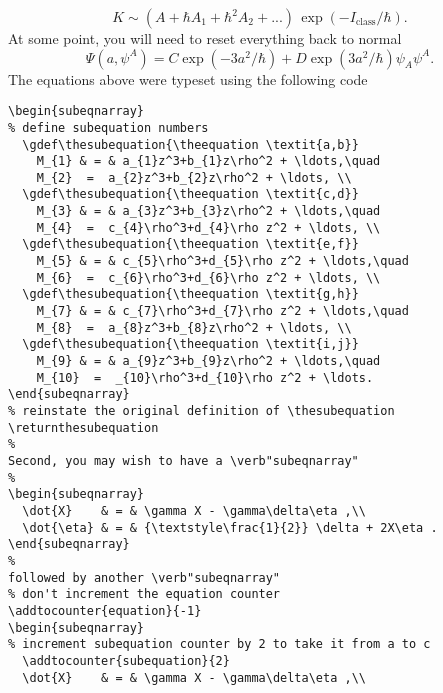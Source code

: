 \documentclass{jfm}
\begin{document}
\let\oldequation=\theequation
\renewcommand\theequation{4.4\textit{e}}
\begin{equation}
  K\sim(A + {\hbar} {A_1} +{{\hbar}^2} {A_2} +...)\,
    \exp(-I_{\mathrm{class}}/{\hbar}).
\end{equation}
%
At some point, you will need to reset everything back to normal
\let\theequation=\oldequation
\setcounter{equation}{4}
\begin{equation}
  \Psi(a, \psi^A) = C \exp(-3a^2/\hbar) + D \exp(3a^2/\hbar)
    {\psi_A}{\psi^A}.
\end{equation}
%
The equations above were typeset using the following code
%
\begin{verbatim}
\begin{subeqnarray}
% define subequation numbers
  \gdef\thesubequation{\theequation \textit{a,b}}
    M_{1} & = & a_{1}z^3+b_{1}z\rho^2 + \ldots,\quad
    M_{2}  =  a_{2}z^3+b_{2}z\rho^2 + \ldots, \\
  \gdef\thesubequation{\theequation \textit{c,d}}
    M_{3} & = & a_{3}z^3+b_{3}z\rho^2 + \ldots,\quad
    M_{4}  =  c_{4}\rho^3+d_{4}\rho z^2 + \ldots, \\
  \gdef\thesubequation{\theequation \textit{e,f}}
    M_{5} & = & c_{5}\rho^3+d_{5}\rho z^2 + \ldots,\quad
    M_{6}  =  c_{6}\rho^3+d_{6}\rho z^2 + \ldots, \\
  \gdef\thesubequation{\theequation \textit{g,h}}
    M_{7} & = & c_{7}\rho^3+d_{7}\rho z^2 + \ldots,\quad
    M_{8}  =  a_{8}z^3+b_{8}z\rho^2 + \ldots, \\
  \gdef\thesubequation{\theequation \textit{i,j}}
    M_{9} & = & a_{9}z^3+b_{9}z\rho^2 + \ldots,\quad
    M_{10}  =  _{10}\rho^3+d_{10}\rho z^2 + \ldots.
\end{subeqnarray}
% reinstate the original definition of \thesubequation
\returnthesubequation
%
Second, you may wish to have a \verb"subeqnarray"
%
\begin{subeqnarray}
  \dot{X}    & = & \gamma X - \gamma\delta\eta ,\\
  \dot{\eta} & = & {\textstyle\frac{1}{2}} \delta + 2X\eta .
\end{subeqnarray}
%
followed by another \verb"subeqnarray"
% don't increment the equation counter
\addtocounter{equation}{-1}
\begin{subeqnarray}
% increment subequation counter by 2 to take it from a to c
  \addtocounter{subequation}{2}
  \dot{X}    & = & \gamma X - \gamma\delta\eta ,\\

\end{verbatim}
\end{document}
